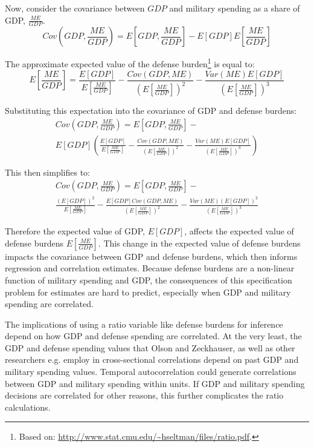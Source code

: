\documentclass[12pt]{article}
\begin{document}
Now, consider the covariance between $GDP$ and military spending as a share of GDP, $\frac{ME}{GDP}$. 
\begin{equation}
Cov\left(GDP, \frac{ME}{GDP} \right) = E\left[GDP, \frac{ME}{GDP} \right] - E[GDP] E\left[\frac{ME}{GDP} \right]
\end{equation}

The approximate expected value of the defense burden\footnote{Based on: \url{http://www.stat.cmu.edu/~hseltman/files/ratio.pdf}.} is equal to:
\begin{equation}
E\left[\frac{ME}{GDP} \right] = \frac{E[GDP]}{E\left[\frac{ME}{GDP} \right]} - \frac{Cov(GDP, ME)}{\left(E\left[\frac{ME}{GDP} \right]\right)^2} - \frac{Var(ME) E[GDP]}{\left(E\left[\frac{ME}{GDP} \right]\right)^3}
\end{equation}

Substituting this expectation into the covariance of GDP and defense burdens:
\begin{multline}
Cov\left(GDP, \frac{ME}{GDP} \right) = E\left[GDP, \frac{ME}{GDP} \right] - \\ E[GDP] \left( \frac{E[GDP]}{E\left[\frac{ME}{GDP} \right]} - \frac{Cov(GDP, ME)}{\left(E\left[\frac{ME}{GDP} \right]\right)^2} - \frac{Var(ME) E[GDP]}{\left(E\left[\frac{ME}{GDP} \right]\right)^3} \right)
\end{multline}

This then simplifies to:
\begin{multline}
Cov\left(GDP, \frac{ME}{GDP} \right) = E\left[GDP, \frac{ME}{GDP} \right] - \\ \frac{(E[GDP])^2}{E\left[\frac{ME}{GDP} \right]} - \frac{E[GDP] Cov(GDP, ME)}{\left(E\left[\frac{ME}{GDP} \right]\right)^2} - \frac{Var(ME) (E[GDP])^2}{\left(E\left[\frac{ME}{GDP} \right]\right)^3}
\end{multline}

Therefore the expected value of GDP, $E[GDP]$, affects the expected value of defense burdens $E\left[\frac{ME}{GDP} \right]$.
This change in the expected value of defense burdens impacts the covariance between GDP and defense burdens, which then informs regression and correlation estimates.  
Because defense burdens are a non-linear function of military spending and GDP, the consequences of this specification problem for estimates are hard to predict, especially when GDP and military spending are correlated. 


The implications of using a ratio variable like defense burdens for inference depend on how GDP and defense spending are correlated. 
At the very least, the GDP and defense spending values that Olson and Zeckhauser, as well as other researchers e.g.\citep{Oneal1990, KimSandler2019} employ in cross-sectional correlations depend on past GDP and military spending values. 
Temporal autocorrelation could generate correlations between GDP and military spending within units.  
If GDP and military spending decisions are correlated for other reasons, this further complicates the ratio calculations. 
\end{document}
